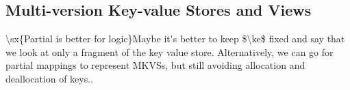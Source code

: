 \subsection{Multi-version Key-value Stores and Views}
\label{sec:mkvs-view}




\ac{\sx{Partial is better for logic}Maybe it's better to keep $\ke$ fixed and say that we look at only a 
fragment of the key value store. Alternatively, we can go for partial mappings to 
represent MKVSs, but still avoiding allocation and deallocation of keys.}.





